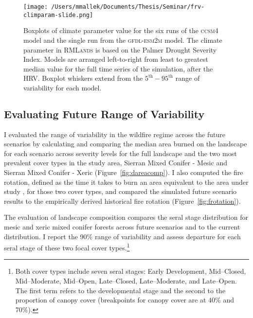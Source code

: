 \begin{figure}[!htbp]
\centering
\texttt{[image: /Users/mmallek/Documents/Thesis/Seminar/frv-climparam-slide.png]}
\caption{Boxplots of climate parameter value for the six runs of the \textsc{ccsm4} model and the single run from the \textsc{gfdl-esm2m} model. The climate parameter in \textsc{RMLands} is based on the Palmer Drought Severity Index. Models are arranged left-to-right from least to greatest median value for the full time series of the simulation, after the HRV. Boxplot whiskers extend from the $5^{\text{th}}-95^{\text{th}}$ range of variability for each model.}
\label{pdsi-boxplots}
\end{figure}


\subsection*{Evaluating Future Range of Variability}
\label{sec:evalFRV}
I evaluated the range of variability in the wildfire regime across the future scenarios by calculating and comparing the median area burned on the landscape for each scenario across severity levels for the full landscape and the two most prevalent cover types in the study area, Sierran Mixed Conifer - Mesic and Sierran Mixed Conifer - Xeric (Figure~\ref{fig:dareacomp}). %
I also computed the fire rotation, defined as the time it takes to burn an area equivalent to the area under study \citep{Agee1993}, for those two cover types, and compared the simulated future scenario results to the empirically derived historical fire rotation (Figure~\ref{fig:frotation}). 
%


The evaluation of landscape composition compares the seral stage distribution for mesic and xeric mixed conifer forests across future scenarios and to the current distribution. I report the 90\% range of variability and assess departure for each seral stage of these two focal cover types.\footnote{Both cover types include seven seral stages: Early Development, Mid--Closed, Mid--Moderate, Mid--Open, Late--Closed, Late--Moderate, and Late--Open. The first term refers to the developmental stage and the second to the proportion of canopy cover (breakpoints for canopy cover are at 40\% and 70\%).}


